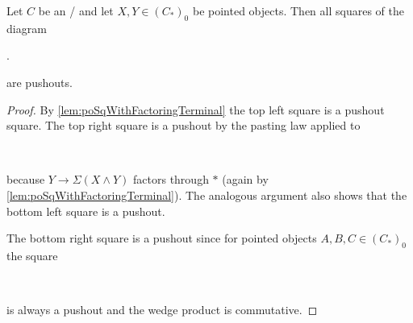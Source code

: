 \begin{lemma}\label{lem:allSqArePo} %
    Let $C$ be an \inftytop/ and let $X,Y\in \left(C_*\right)_0$ be pointed objects. 
    Then all squares of the diagram         
    \begin{center}
        \;.
    \end{center}
    are pushouts.
    \begin{proof}
        By \cref{lem:poSqWithFactoringTerminal} the top left square is a pushout square.
        The top right square is a pushout by the pasting law applied to
        \begin{center}
            \
        \end{center}
        because $Y\to\Sigma\left(X\wedge Y\right)$ factors through $*$ (again by \cref{lem:poSqWithFactoringTerminal}).
        The analogous argument also shows that the bottom left square is a pushout.

        The bottom right square is a pushout since for pointed objects $A,B,C\in \left(C_*\right)_0$ the square
        \begin{center}
            \
        \end{center}
        is always a pushout and the wedge product is commutative. %
    \end{proof}
\end{lemma}
